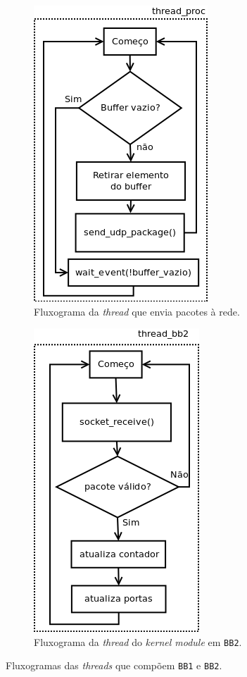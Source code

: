 \begin{figure}[h!]
\begin{subfigure}{.33\textwidth}
		\end{subfigure}%
		\begin{subfigure}{.33\textwidth}
		  \centering
		  \includegraphics[scale=0.55]{image/thread_proc}
		  \caption{\centering Fluxograma da \textit{thread} que envia pacotes à
		  rede.}
		  \label{fig:thread_proc} 
		\end{subfigure}%
		\begin{subfigure}{.33\textwidth}
			\centering
			\includegraphics[scale=0.55]{image/thread_bb2}
			\caption {\centering Fluxograma da \textit{thread} do \textit{kernel module}
			em
			\texttt{BB2}.}
			\label{fig:thread_bb2}
		\end{subfigure}%
		\caption{Fluxogramas das \textit{threads} que compõem \texttt{BB1}
		e \texttt{BB2}.}
		\label{fig:threads_bb1}
		\end{figure} 

